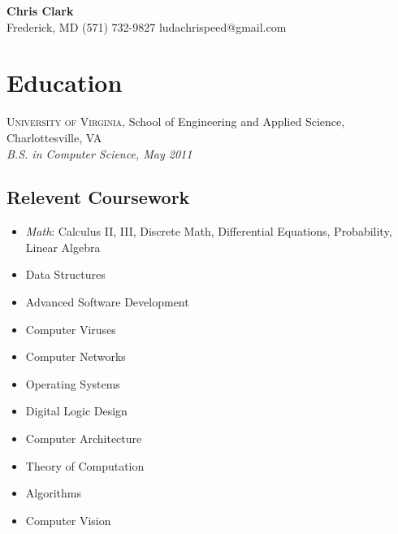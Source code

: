 \documentclass[a4paper,11pt]{article}
\begin{document}
\begin{center}
  {\sffamily \huge \textbf{Chris Clark}} \\ 
  Frederick, MD \enspace\textopenbullet\enspace
  (571) 732-9827 \enspace\textopenbullet\enspace
  ludachrispeed@gmail.com
\end{center}


\vspace{-8pt}
\section*{Education}

  \textsc{University of Virginia}, School of Engineering and Applied Science,
  Charlottesville, VA \\
  \textit{B.S. in Computer Science, May 2011}

%

  \subsection*{Relevent Coursework}

  \begin{multicols}{3} 
    \raggedright

    \begin{itemize}
    \item \textit{Math}: Calculus II, III, Discrete Math, Differential Equations, Probability,
      Linear Algebra
    \item Data Structures
    \item Advanced Software Development
    \item Computer Viruses
    \item Computer Networks
    \item Operating Systems
    \item Digital Logic Design
    \item Computer Architecture
    \item Theory of Computation
    \item Algorithms
    \item Computer Vision
    \end{itemize}
  \end{multicols}
\end{document}
